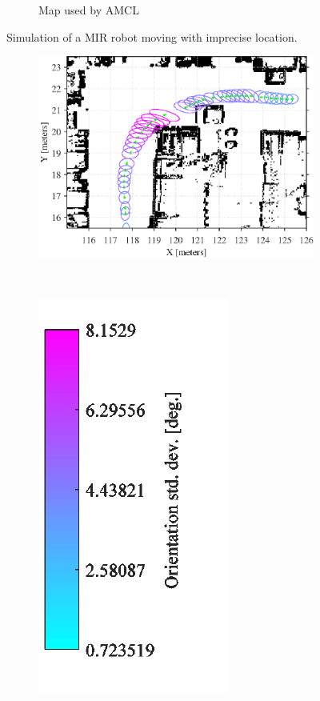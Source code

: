 \begin{figure}
\begin{subfigure}[b]{0.45\textwidth}
		\caption{Map used by AMCL}
		\label{fig:simulated_small_amcl_map}
	\end{subfigure}
	\caption{Simulation of a MIR robot moving with imprecise location.}
	\label{fig:test_map_setup}
\end{figure}


\begin{figure}[tbph]
\centering
	\begin{subfigure}[b]{0.75\textwidth}
		\includegraphics[scale=1.0]{figures/static_mapping/amcl_covariance}		
		\label{fig:amcl_covariance}
	\end{subfigure}
	~ %
	\begin{subfigure}[b]{0.2\textwidth}
		\includegraphics[scale=1.0]{figures/static_mapping/amcl_covariance_bar}

\end{subfigure}
\end{figure}
